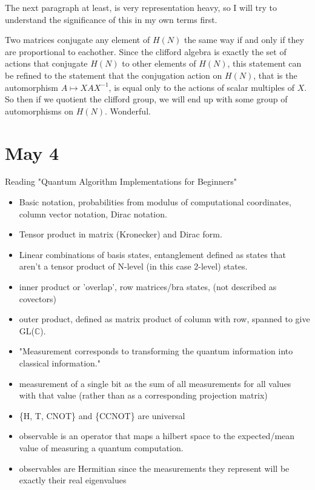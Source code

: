 \documentclass[]{article}
\begin{document}
The next paragraph at least, is very representation heavy, so I will try to understand the significance of this in my own terms first.

Two matrices conjugate any element of $H(N)$ the same way if and only if they are proportional to eachother. Since the clifford algebra is exactly the set of actions that conjugate $H(N)$ to other elements of $H(N)$, this statement can be refined to the statement that the conjugation action on $H(N)$, that is the automorphism $A \mapsto XAX^{-1}$, is equal only to the actions of scalar multiples of $X$. So then if we quotient the clifford group, we will end up with some group of automorphisms on $H(N)$. Wonderful.

\section{May 4}

Reading "Quantum Algorithm Implementations for Beginners"

\begin{itemize}
	\item Basic notation, probabilities from modulus of computational coordinates, column vector notation, Dirac notation.
\item Tensor product in matrix (Kronecker) and Dirac form.
\item Linear combinations of basis states, entanglement defined as states that aren't a tensor product of N-level (in this case 2-level) states.
\item inner product or 'overlap', row matrices/bra states, (not described as covectors)
\item outer product, defined as matrix product of column with row, spanned to give GL($\mathbb{C}$).
\item "Measurement corresponds to transforming the quantum information into classical information."
\item measurement of a single bit as the sum of all measurements for all values with that value (rather than as a corresponding projection matrix)
\item \{H, T, CNOT\} and \{CCNOT\} are universal
\item observable is an operator that maps a hilbert space to the expected/mean value of measuring a quantum computation.
\item observables are Hermitian since the measurements they represent will be exactly their real eigenvalues
\end{itemize}
\end{document}
